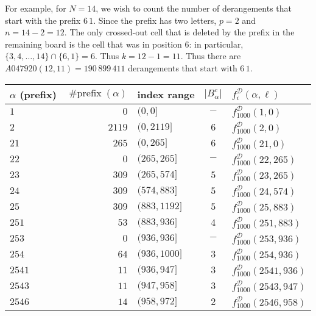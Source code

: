 \begin{example}
  For example, for $N = 14$, we wish to count the number of derangements that
  start with the prefix $6\,1$. Since the prefix has two letters, $p = 2$ and
  $n = 14 - 2 = 12$. The only crossed-out cell that is deleted by the prefix in the
  remaining board is the cell that was in position $6$:
  in particular, $\{3,4,\dots,14\} \cap \{6, 1\} = 6$.
  Thus $k = 12 - 1 = 11$.
  Thus there are $A047920(12,11) = 190\,899\,411$ derangements that start
  with $6\,1$.
\end{example}
\begin{table}
\begin{tabular}{|l|r|l|c|l|}
  \hline
  $\alpha$ (prefix)   & $\operatorname{\#prefix}(\alpha)$ & index range & $|B_\alpha^c|$ & $f^{\mathcal{D}}_i(\alpha, \ell)$ \\
  \hline
  $1       $ & $0$    & $(0,0]$           & $-$ & $f^{\mathcal{D}}_{1000}(1, 0)$          \\
  $2       $ & $2119$ & $(0,2119]$        & $6$ & $f^{\mathcal{D}}_{1000}(2, 0)$          \\
  \hline
  $21      $ & $265$  & $(0, 265]$        & $6$ & $f^{\mathcal{D}}_{1000}(21, 0)$         \\
  $22      $ & $0$    & $(265, 265]$      & $-$ & $f^{\mathcal{D}}_{1000}(22, 265)$       \\
  $23      $ & $309$  & $(265, 574]$      & $5$ & $f^{\mathcal{D}}_{1000}(23, 265)$       \\
  $24      $ & $309$  & $(574, 883]$      & $5$ & $f^{\mathcal{D}}_{1000}(24, 574)$       \\
  $25      $ & $309$  & $(883, 1192]$     & $5$ & $f^{\mathcal{D}}_{1000}(25, 883)$       \\
  \hline
  $251     $ & $53$   & $(883, 936]$      & $4$ & $f^{\mathcal{D}}_{1000}(251, 883)$      \\
  $253     $ & $0$    & $(936, 936]$      & $-$ & $f^{\mathcal{D}}_{1000}(253, 936)$      \\
  $254     $ & $64$   & $(936, 1000]$     & $3$ & $f^{\mathcal{D}}_{1000}(254, 936)$      \\
  \hline
  $2541    $ & $11$   & $(936, 947]$      & $3$ & $f^{\mathcal{D}}_{1000}(2541, 936)$     \\
  $2543    $ & $11$   & $(947, 958]$      & $3$ & $f^{\mathcal{D}}_{1000}(2543, 947)$     \\
  $2546    $ & $14$   & $(958, 972]$      & $2$ & $f^{\mathcal{D}}_{1000}(2546, 958)$     \\

\end{tabular}
\end{table}
